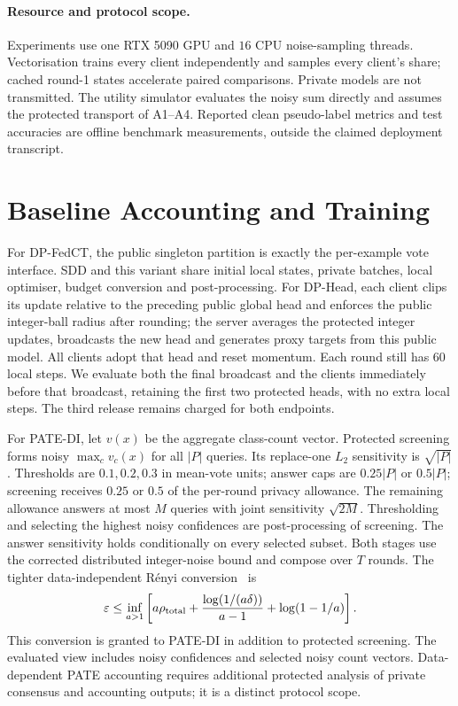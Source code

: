 \paragraph{Resource and protocol scope.}
Experiments use one RTX 5090 GPU and $16$ CPU noise-sampling threads.
Vectorisation trains every client independently and samples every client's
share; cached round-1 states accelerate paired comparisons.
Private models are not transmitted. The utility simulator evaluates the noisy
sum directly and assumes the protected transport of A1--A4.
Reported clean pseudo-label metrics and test accuracies are offline benchmark
measurements, outside the claimed deployment transcript.

\section{Baseline Accounting and Training}
\label{app:baselines}

For DP-FedCT, the public singleton partition is exactly the per-example vote
interface. SDD and this variant share initial local states, private batches,
local optimiser, budget conversion and post-processing.
For DP-Head, each client clips its update relative to the preceding public
global head and enforces the public integer-ball radius after rounding; the server averages the protected integer updates, broadcasts
the new head and generates proxy targets from this public model.
All clients adopt that head and reset momentum. Each round still has $60$
local steps. We evaluate both the final broadcast and the clients immediately before that
broadcast, retaining the first two protected heads, with no extra local steps.
The third release remains charged for both endpoints.

For PATE-DI, let $v(x)$ be the aggregate class-count vector.
Protected screening forms noisy $\max_c v_c(x)$ for all $|P|$ queries.
Its replace-one $L_2$ sensitivity is $\sqrt{|P|}$.
Thresholds are $0.1,0.2,0.3$ in mean-vote units; answer caps are
$0.25|P|$ or $0.5|P|$; screening receives $0.25$ or $0.5$ of the per-round
privacy allowance. The remaining allowance answers at most $M$ queries with
joint sensitivity $\sqrt{2M}$. Thresholding and selecting the highest noisy
confidences are post-processing of screening. The answer sensitivity holds
conditionally on every selected subset. Both stages use the corrected
distributed integer-noise bound and compose over $T$ rounds.
The tighter data-independent R\'enyi conversion~\cite{balle2020hypothesis} is
\begin{equation}
\varepsilon\le\inf_{a>1}\left[
a\rho_{\rm total}+\frac{\log(1/(a\delta))}{a-1}
+\log(1-1/a)\right].
\end{equation}
This conversion is granted to PATE-DI in addition to protected screening.
The evaluated view includes noisy confidences and selected noisy count vectors.
Data-dependent PATE accounting requires additional protected analysis of
private consensus and accounting outputs; it is a distinct protocol scope.

